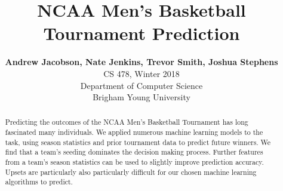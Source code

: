 \documentclass[conference]{IEEEtran}
\begin{document}
\title{NCAA Men's Basketball Tournament Prediction}

\author{
  \textbf{Andrew Jacobson, Nate Jenkins, Trevor Smith, Joshua Stephens}\\
  CS 478, Winter 2018\\
  Department of Computer Science\\
  Brigham Young University\\
}
\maketitle

\thispagestyle{plain}
\pagestyle{plain}


\begin{abstract}
Predicting the outcomes of the NCAA Men's Basketball Tournament has long fascinated many individuals.
We applied numerous machine learning models to the task, using season statistics and prior tournament data to predict future winners.
We find that a team's seeding dominates the decision making process.
Further features from a team's season statistics can be used to slightly improve prediction accuracy.
Upsets are particularly also particularly difficult for our chosen machine learning algorithms to predict.
\end{abstract}













\end{document}
